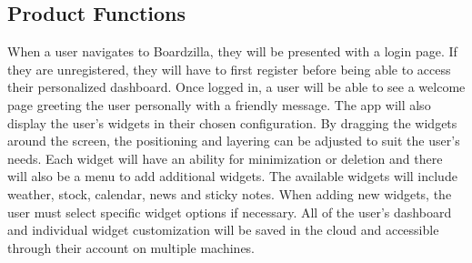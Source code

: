 \documentclass[]{article}
\begin{document}
	\subsection{Product Functions}
	\label{sub:product_functions}
	When a user navigates to Boardzilla, they will be presented with a login page. If they are unregistered, they will have to first register before being able to access their personalized dashboard. Once logged in, a user will be able to see a welcome page greeting the user personally with a friendly message. The app will also display the user's widgets in their chosen configuration. By dragging the widgets around the screen, the positioning and layering can be adjusted to suit the user's needs. Each widget will have an ability for minimization or deletion and there will also be a menu to add additional widgets. The available widgets will include weather, stock, calendar, news and sticky notes. When adding new widgets, the user must select specific widget options if necessary. All of the user's dashboard and individual widget customization will be saved in the cloud and accessible through their account on multiple machines.
	
\end{document}
